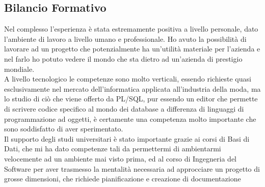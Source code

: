 \subsection{Bilancio Formativo}
Nel complesso l'esperienza è stata estremamente positiva a livello personale, dato l'ambiente di lavoro a livello umano e professionale. Ho avuto la possibilità di lavorare ad un progetto che potenzialmente ha un'utilità materiale per l'azienda e nel farlo ho potuto vedere il mondo che sta dietro ad un'azienda di prestigio mondiale.\\
A livello tecnologico le competenze sono molto verticali, essendo richieste quasi esclusivamente nel mercato dell'informatica applicata all'industria della moda, ma lo studio di ciò che viene offerto da PL/SQL, pur essendo un editor che permette di scrivere codice specifico al mondo dei database a differenza di linguaggi di programmazione ad oggetti, è certamente una competenza molto importante che sono soddisfatto di aver sperimentato.\\
Il supporto degli studi universitari è stato importante grazie ai corsi di Basi di Dati, che mi ha dato competenze tali da permettermi di ambientarmi velocemente ad un ambiente mai visto prima, ed al corso di Ingegneria del Software per aver trasmesso la mentalità necessaria ad approcciare un progetto di grosse dimensioni, che richiede pianificazione e creazione di documentazione
